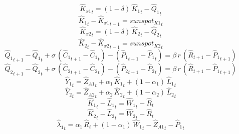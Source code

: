 \begin{dmath}
{{\hat{K}_{x1}}}_{t}=\left(1-{{\delta}}\right)\, {{\hat{K}_{1}}}_{t}-{{\hat{Q}_{1}}}_{t}
\end{dmath}
\begin{dmath}
{{\hat{K}_{1}}}_{t}-{{\hat{K}_{x1}}}_{t-1}={{sunspot_{K1}}}_{t}
\end{dmath}
\begin{dmath}
{{\hat{K}_{x2}}}_{t}=\left(1-{{\delta}}\right)\, {{\hat{K}_{2}}}_{t}-{{\hat{Q}_{2}}}_{t}
\end{dmath}
\begin{dmath}
{{\hat{K}_{2}}}_{t}-{{\hat{K}_{x2}}}_{t-1}={{sunspot_{K2}}}_{t}
\end{dmath}
\begin{dmath}
{{\hat{Q}_{1}}}_{t+1}-{{\hat{Q}_{1}}}_{t}+{{\sigma}}\, \left({{\hat{C}_{1}}}_{t+1}-{{\hat{C}_{1}}}_{t}\right)-\left({{\hat{P}_{1}}}_{t+1}-{{\hat{P}_{1}}}_{t}\right)={{\beta}}\, {r}\, \left({{\hat{R}}}_{t+1}-{{\hat{P}_{1}}}_{t+1}\right)
\end{dmath}
\begin{dmath}
{{\hat{Q}_{2}}}_{t+1}-{{\hat{Q}_{2}}}_{t}+{{\sigma}}\, \left({{\hat{C}_{2}}}_{t+1}-{{\hat{C}_{2}}}_{t}\right)-\left({{\hat{P}_{2}}}_{t+1}-{{\hat{P}_{2}}}_{t}\right)={{\beta}}\, {r}\, \left({{\hat{R}}}_{t+1}-{{\hat{P}_{1}}}_{t+1}\right)
\end{dmath}
\begin{dmath}
{{\hat{Y}_{1}}}_{t}={{\hat{Z}_{A1}}}_{t}+{{\alpha_{1}}}\, {{\hat{K}_{1}}}_{t}+\left(1-{{\alpha_{1}}}\right)\, {{\hat{L}_{1}}}_{t}
\end{dmath}
\begin{dmath}
{{\hat{Y}_{2}}}_{t}={{\hat{Z}_{A2}}}_{t}+{{\alpha_{2}}}\, {{\hat{K}_{2}}}_{t}+\left(1-{{\alpha_{2}}}\right)\, {{\hat{L}_{2}}}_{t}
\end{dmath}
\begin{dmath}
{{\hat{K}_{1}}}_{t}-{{\hat{L}_{1}}}_{t}={{\hat{W}_{1}}}_{t}-{{\hat{R}}}_{t}
\end{dmath}
\begin{dmath}
{{\hat{K}_{2}}}_{t}-{{\hat{L}_{2}}}_{t}={{\hat{W}_{2}}}_{t}-{{\hat{R}}}_{t}
\end{dmath}
\begin{dmath}
{{\hat{\lambda}_{1}}}_{t}={{\alpha_{1}}}\, {{\hat{R}}}_{t}+\left(1-{{\alpha_{1}}}\right)\, {{\hat{W}_{1}}}_{t}-{{\hat{Z}_{A1}}}_{t}-{{\hat{P}_{1}}}_{t}
\end{dmath}
